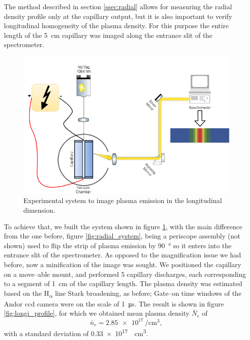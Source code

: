 \documentclass[../main.tex]{subfiles}
\begin{document}
The method described in section \ref{ssec:radial} allows for measuring the radial density profile only at the capillary output, but it is also important to verify longitudinal homogeneity of the plasma density. For this purpose the entire length of the \SI{5}{\cm} capillary was imaged along the entrance slit of the spectrometer.
\begin{figure}
    \centering
    \includegraphics[width=\textwidth]{figures/spectro/longitudinal_system.png}
    \caption{Experimental system to image plasma emission in the longitudinal dimension.}
    \label{fig:longi_system}
\end{figure}

To achieve that, we built the system shown in figure \ref{fig:longi_system}, with the main difference from the one before, figure \ref{fig:radial_system}, being a periscope assembly (not shown) used to flip the strip of plasma emission by \SI{90}{\degree} so it enters into the entrance slit of the spectrometer. As opposed to the magnification issue we had before, now a minification of the image was sought. We positioned the capillary on a move--able mount, and performed 5 capillary discharges, each corresponding to a segment of \SI{1}{\cm} of the capillary length. The plasma density was estimated based on the H\textsubscript{$\alpha$} line Stark broadening, as before; Gate--on time windows of the Andor ccd camera were on the scale of \SI{1}{\us}. The result is shown in figure \ref{fig:longi_profile}, for which we obtained mean plasma density $\bar{N}_e$ of
\begin{equation*}
    \bar{n}_e=\SI{2.85e17}{\per\cubic\cm},
\end{equation*}
with a standard deviation of \SI{0.33e17}{\per\cubic\cm}.
\end{document}
